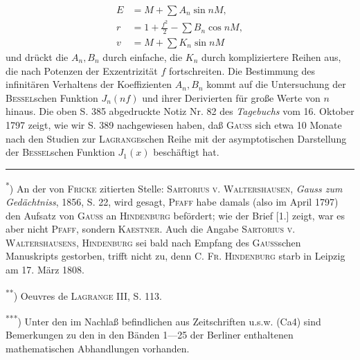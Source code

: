 \[
\begin{aligned}
E&=M+\sum A_n\sin nM,\\
r&=1+\frac{f^2}{2}-\sum B_n\cos nM,\\
v&=M+\sum K_n\sin nM
\end{aligned}
\]
\noindent und drückt die \(A_n,B_n\) durch einfache, die \(K_n\) durch kompliziertere Reihen aus, die nach Potenzen der Exzentrizität \(f\) fortschreiten. Die Bestimmung des infinitären Verhaltens der Koeffizienten \(A_n,B_n\) kommt auf die Untersuchung der \textsc{Bessel}schen Funktion \(J_n(nf)\) und ihrer Derivierten für große Werte von \(n\) hinaus. Die oben S. 385 abgedruckte Notiz Nr. 82 des \textit{Tagebuchs} vom 16. Oktober 1797 zeigt, wie wir S. 389 nachgewiesen haben, daß \textsc{Gauss} sich etwa 10 Monate nach den Studien zur \textsc{Lagrange}schen Reihe mit der asymptotischen Darstellung der \textsc{Bessel}schen Funktion \(J_1(x)\) beschäftigt hat.
\par\medskip\noindent\rule{.24\linewidth}{.4pt}\par\smallskip
\noindent\hspace*{\parindent}\textsuperscript{*}) An der von \textsc{Fricke} zitierten Stelle: \textsc{Sartorius v. Waltershausen}, \textit{Gauss zum Gedächtniss}, 1856, S. 22, wird gesagt, \textsc{Pfaff} habe damals (also im April 1797) den Aufsatz von \textsc{Gauss} an \textsc{Hindenburg} befördert; wie der Brief [1.] zeigt, war es aber nicht \textsc{Pfaff}, sondern \textsc{Kaestner}. Auch die Angabe \textsc{Sartorius v. Waltershausens}, \textsc{Hindenburg} sei bald nach Empfang des \textsc{Gauss}schen Manuskripts gestorben, trifft nicht zu, denn \textsc{C. Fr. Hindenburg} starb in Leipzig am 17. März 1808.
\par\noindent\hspace*{\parindent}\textsuperscript{**}) Oeuvres de \textsc{Lagrange} III, S. 113.
\par\noindent\hspace*{\parindent}\textsuperscript{***}) Unter den im Nachlaß befindlichen  aus Zeitschriften u.s.w. (Ca4) sind Bemerkungen zu den in den Bänden 1—25 der Berliner  enthaltenen mathematischen Abhandlungen vorhanden.
\par\endgroup
{}
